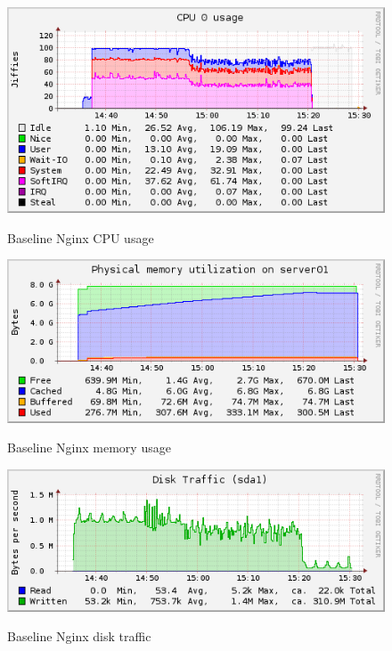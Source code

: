 \documentclass[Measurements]{subfiles}
\begin{document}
\begin{figure}[H]
\centering
\caption{Baseline Nginx CPU usage}
\includegraphics[scale=0.7]{images/results/200_without_naxsi/cpu.png}
\label{fig:Baseline Nginx CPU usage}
\end{figure}

\begin{figure}[H]
\centering
\caption{Baseline Nginx memory usage}
\includegraphics[scale=0.7]{images/results/200_without_naxsi/memory.png}
\label{fig:Baseline Nginx memory usage}
\end{figure}

\begin{figure}[H]
\centering
\caption{Baseline Nginx disk traffic}
\includegraphics[scale=0.7]{images/results/200_without_naxsi/disk.png}
\label{fig:Baseline Nginx disk traffic}
\end{figure}
\end{document}

